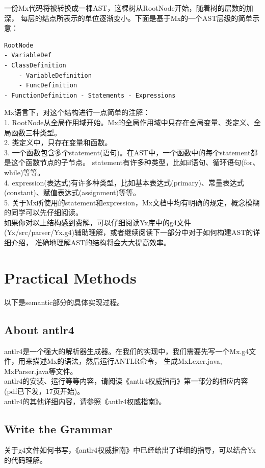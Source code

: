 一份Mx代码将被转换成一棵AST，这棵树从RootNode开始，随着树的层数的加深，
每层的结点所表示的单位逐渐变小。下面是基于Mx的一个AST层级的简单示意：
\begin{lstlisting}
RootNode 
- VariableDef
- ClassDefinition
    - VariableDefinition
    - FuncDefinition
- FunctionDefinition - Statements - Expressions 
\end{lstlisting}

Mx语言下，对这个结构进行一点简单的注解：\\
1. RootNode从全局作用域开始。Mx的全局作用域中只存在全局变量、类定义、全局函数三种类型。\\
2. 类定义中，只存在变量和函数。 \\
3. 一个函数包含多个statement(语句)。在AST中，一个函数中的每个statement都是这个函数节点的子节点。
statement有许多种类型，比如if语句、循环语句(for、while)等等。\\
4. expression(表达式)有许多种类型，比如基本表达式(primary)、常量表达式(constant)、赋值表达式(assignment)等等。 \\
5. 关于Mx所使用的statement和expression，Mx文档中均有明确的规定，概念模糊的同学可以先仔细阅读。 \\

如果你对以上结构感到费解，可以仔细阅读Yx库中的g4文件(Yx/src/parser/Yx.g4)辅助理解，或者继续阅读下一部分中对于如何构建AST的详细介绍，
准确地理解AST的结构将会大大提高效率。\\

\section{Practical Methods}
以下是semantic部分的具体实现过程。

\subsection{About antlr4}
antlr4是一个强大的解析器生成器。在我们的实现中，我们需要先写一个Mx.g4文件，用来描述Mx的语法，然后运行ANTLR命令，
生成MxLexer.java, MxParser.java等文件。\\

antlr4的安装、运行等等内容，请阅读《antlr4权威指南》第一部分的相应内容(pdf已下发，17页开始)。\\

antlr4的其他详细内容，请参照《antlr4权威指南》。

\subsection{Write the Grammar}
关于g4文件如何书写，《antlr4权威指南》中已经给出了详细的指导，可以结合Yx的代码理解。\\

